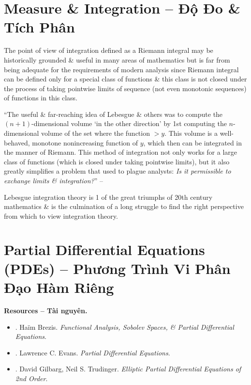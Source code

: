 \documentclass{article}
\begin{document}
\section{Measure \& Integration -- Độ Đo \& Tích Phân}
The point of view of integration defined as a Riemann integral may be historically grounded \& useful in many areas of mathematics but is far from being adequate for the requirements of modern analysis since Riemann integral can be defined only for a special class of functions \& this class is not closed under the process of taking pointwise limits of sequence (not even monotonic sequences) of functions in this class.

``The useful \& far-reaching idea of Lebesgue \& others was to compute the $(n + 1)$-dimensional volume `in the other direction' by 1st computing the $n$-dimensional volume of the set where the function $> y$. This volume is a well-behaved, monotone nonincreasing function of $y$, which then can be integrated in the manner of Riemann. This method of integration not only works for a large class of functions (which is closed under taking pointwise limits), but it also greatly simplifies a problem that used to plague analysts: {\it Is it permissible to exchange limits \& integration?}'' -- \cite[Chap. 1, pp. 1--2]{Lieb_Loss2001}

Lebesgue integration theory is 1 of the great triumphs of 20th century mathematics \& is the culmination of a long struggle to find the right perspective from which to view integration theory.


\section{Partial Differential Equations (PDEs) -- Phương Trình Vi Phân Đạo Hàm Riêng}
\noindent\textbf{\textsf{Resources -- Tài nguyên.}}
\begin{itemize}
	\item \cite{Brezis2011}. {\sc Ha\"im Brezis}. {\it Functional Analysis, Sobolev Spaces, \& Partial Differential Equations}.
	\item \cite{Evans2010}. {\sc Lawrence C. Evans}. {\it Partial Differential Equations}.
	\item \cite{Gilbarg_Trudinger2001}. {\sc David Gilbarg, Neil S. Trudinger}. {\it Elliptic Partial Differential Equations of 2nd Order}.
\end{itemize}
\end{document}
